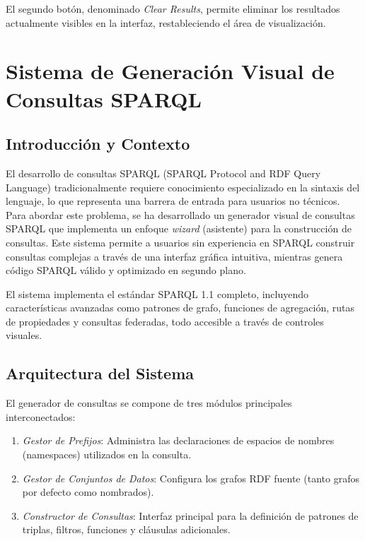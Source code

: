 \documentclass{article}
\begin{document}
El segundo botón, denominado \textit{Clear Results}, permite eliminar los resultados actualmente visibles en la interfaz, restableciendo el área de visualización.


\section{Sistema de Generación Visual de Consultas SPARQL}
\label{sec:sparql-query-generator}

\subsection{Introducción y Contexto}
\label{subsec:sparql-intro}

El desarrollo de consultas SPARQL (SPARQL Protocol and RDF Query Language) tradicionalmente requiere conocimiento especializado en la sintaxis del lenguaje, lo que representa una barrera de entrada para usuarios no técnicos. Para abordar este problema, se ha desarrollado un generador visual de consultas SPARQL que implementa un enfoque \textit{wizard} (asistente) para la construcción de consultas. Este sistema permite a usuarios sin experiencia en SPARQL construir consultas complejas a través de una interfaz gráfica intuitiva, mientras genera código SPARQL válido y optimizado en segundo plano.

El sistema implementa el estándar SPARQL 1.1 completo, incluyendo características avanzadas como patrones de grafo, funciones de agregación, rutas de propiedades y consultas federadas, todo accesible a través de controles visuales.

\subsection{Arquitectura del Sistema}
\label{subsec:sparql-architecture}

El generador de consultas se compone de tres módulos principales interconectados:

\begin{enumerate}
    \item \textit{Gestor de Prefijos}: Administra las declaraciones de espacios de nombres (namespaces) utilizados en la consulta.
    \item \textit{Gestor de Conjuntos de Datos}: Configura los grafos RDF fuente (tanto grafos por defecto como nombrados).
    \item \textit{Constructor de Consultas}: Interfaz principal para la definición de patrones de triplas, filtros, funciones y cláusulas adicionales.
\end{enumerate}
\end{document}
